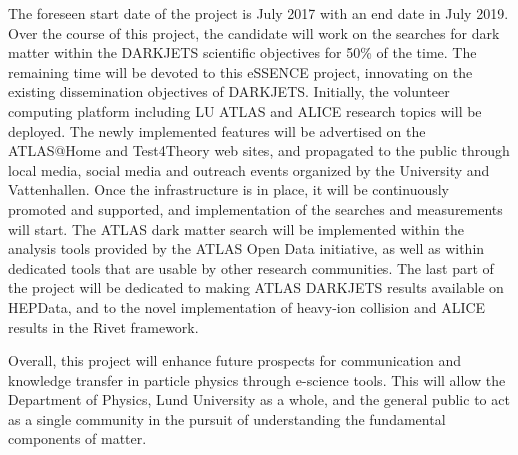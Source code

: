 \documentclass[a4paper,justified]{tufte-handout}
\begin{document}
The foreseen start date of the project is July 2017 with an end date in July 2019. 
Over the course of this project, the candidate will work on the searches for
dark matter within the DARKJETS scientific objectives for 50\% of the
time. The remaining time will be devoted to this eSSENCE project, innovating
on the existing dissemination objectives of DARKJETS. Initially, the volunteer
computing platform including LU ATLAS and ALICE research topics
will be deployed. The newly implemented features will be advertised on the
ATLAS@Home and Test4Theory web sites, and propagated to the public through
local media, social media and outreach events organized by the University and
Vattenhallen. Once the infrastructure is in place, it will be continuously
promoted and supported, and implementation of the searches and measurements
will start. The ATLAS dark matter search will be implemented within the
analysis tools provided by the ATLAS Open Data initiative, as well as within
dedicated tools that are usable by other research communities. The last part
of the project will be dedicated to making ATLAS DARKJETS results available on
HEPData, and to the novel implementation of heavy-ion collision and ALICE results in the Rivet framework.  


Overall, this project will enhance future prospects for communication and knowledge transfer in particle physics through e-science tools. This will allow the Department of Physics, Lund University as a whole, and the general public to act as a single community in the pursuit of understanding the fundamental components of matter. 

\clearpage



\end{document}

